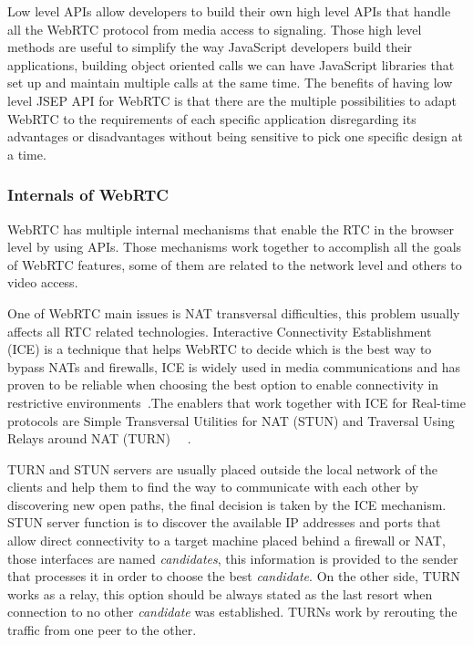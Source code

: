 Low level APIs allow developers to build their own high level APIs that handle all the WebRTC protocol from media access to signaling. Those high level methods are useful to simplify the way JavaScript developers build their applications, building object oriented calls we can have JavaScript libraries that set up and maintain multiple calls at the same time. The benefits of having low level JSEP API for WebRTC is that there are the multiple possibilities to adapt WebRTC to the requirements of each specific application disregarding its advantages or disadvantages without being sensitive to pick one specific design at a time.


\subsubsection{Internals of WebRTC}
\label{sec:internals}

WebRTC has multiple internal mechanisms that enable the RTC in the browser level by using APIs. Those mechanisms work together to accomplish all the goals of WebRTC features, some of them are related to the network level and others to video access.

One of WebRTC main issues is NAT transversal difficulties, this problem usually affects all RTC related technologies. Interactive Connectivity Establishment (ICE)  is a technique that helps WebRTC to decide which is the best way to bypass NATs and firewalls, ICE is widely used in media communications and has proven to be reliable when choosing the best option to enable connectivity in restrictive environments~\cite{iceIETF}.The enablers that work together with ICE for Real-time protocols are Simple Transversal Utilities for NAT (STUN)  and Traversal Using Relays around NAT (TURN) ~\cite{stunIETF}~\cite{turnIETF}.

TURN and STUN servers are usually placed outside the local network of the clients and help them to find the way to communicate with each other by discovering new open paths, the final decision is taken by the ICE mechanism. STUN server function is to discover the available IP addresses and ports that allow direct connectivity to a target machine placed behind a firewall or NAT, those interfaces are named {\it candidates}, this information is provided to the sender that processes it in order to choose the best {\it candidate}. On the other side, TURN works as a relay, this option should be always stated as the last resort when connection to no other {\it candidate} was established. TURNs work by rerouting the traffic from one peer to the other. 

